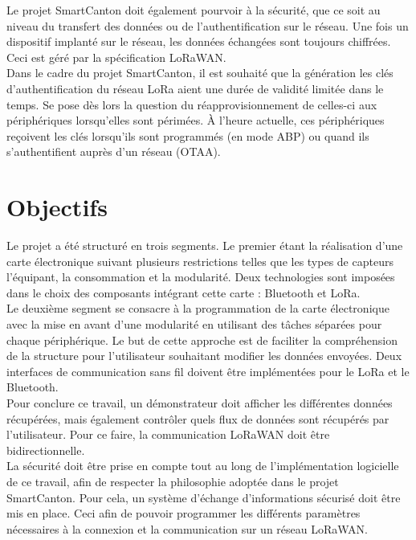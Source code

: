 Le projet SmartCanton doit également pourvoir à la sécurité, que ce soit au niveau du transfert des données ou de l'authentification sur le réseau. Une fois un dispositif implanté sur le réseau, les données échangées sont toujours chiffrées. Ceci est géré par la spécification LoRaWAN. \\

Dans le cadre du projet SmartCanton, il est souhaité que la génération les clés d'authentification du réseau LoRa aient une durée de validité limitée dans le temps. Se pose dès lors la question du réapprovisionnement de celles-ci aux périphériques lorsqu'elles sont périmées. À l'heure actuelle, ces périphériques reçoivent les clés lorsqu'ils sont programmés (en mode ABP) ou quand ils s'authentifient auprès d'un réseau (OTAA). 


\section{Objectifs}

Le projet a été structuré en trois segments. Le premier étant la réalisation d'une carte électronique suivant plusieurs restrictions telles que les types de capteurs l'équipant, la consommation et la modularité. Deux technologies sont imposées dans le choix des composants intégrant cette carte : Bluetooth et LoRa. \\


Le deuxième segment se consacre à la programmation de la carte électronique avec la mise en avant d'une modularité en utilisant des tâches séparées pour chaque périphérique. Le but de cette approche est de faciliter la compréhension de la structure pour l'utilisateur souhaitant modifier les données envoyées. Deux interfaces de communication sans fil doivent être implémentées pour le LoRa et le Bluetooth. \\


Pour conclure ce travail, un démonstrateur doit afficher les différentes données récupérées, mais également contrôler quels flux de données sont récupérés par l'utilisateur. Pour ce faire, la communication LoRaWAN doit être bidirectionnelle. \\


La sécurité doit être prise en compte tout au long de l'implémentation logicielle de ce travail, afin de respecter la philosophie adoptée dans le projet SmartCanton. Pour cela, un système d'échange d'informations sécurisé doit être mis en place. Ceci afin de pouvoir programmer les différents paramètres nécessaires à la connexion et la communication sur un réseau LoRaWAN. \\
